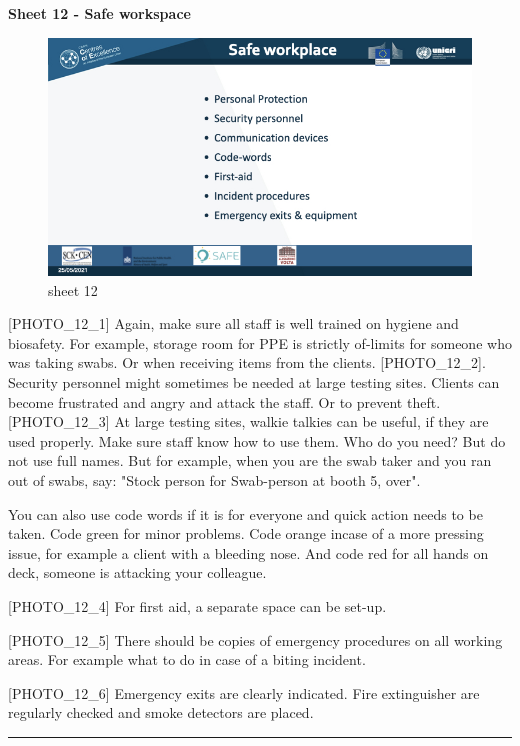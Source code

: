 \documentclass[
]{book}
\begin{document}
\textbf{Sheet 12 - Safe workspace}

\begin{figure}
\centering
\includegraphics{images/m05/m05_Workflow_final.012.jpeg}
\caption{sheet 12}
\end{figure}

{[}PHOTO\_12\_1{]} Again, make sure all staff is well trained on hygiene and
biosafety. For example, storage room for PPE is strictly of-limits for
someone who was taking swabs. Or when receiving items from the clients.
{[}PHOTO\_12\_2{]}. Security personnel might sometimes be needed at large
testing sites. Clients can become frustrated and angry and attack the
staff. Or to prevent theft. {[}PHOTO\_12\_3{]} At large testing sites,
walkie talkies can be useful, if they are used properly. Make sure staff
know how to use them. Who do you need? But do not use full names. But
for example, when you are the swab taker and you ran out of swabs, say:
"Stock person for Swab-person at booth 5, over".

You can also use code words if it is for everyone and quick action needs
to be taken. Code green for minor problems. Code orange incase of a more
pressing issue, for example a client with a bleeding nose. And code red
for all hands on deck, someone is attacking your colleague.

{[}PHOTO\_12\_4{]} For first aid, a separate space can be set-up.

{[}PHOTO\_12\_5{]} There should be copies of emergency procedures on all
working areas. For example what to do in case of a biting incident.

{[}PHOTO\_12\_6{]} Emergency exits are clearly indicated. Fire extinguisher
are regularly checked and smoke detectors are placed.

\begin{center}\rule{0.5\linewidth}{0.5pt}\end{center}
\end{document}
